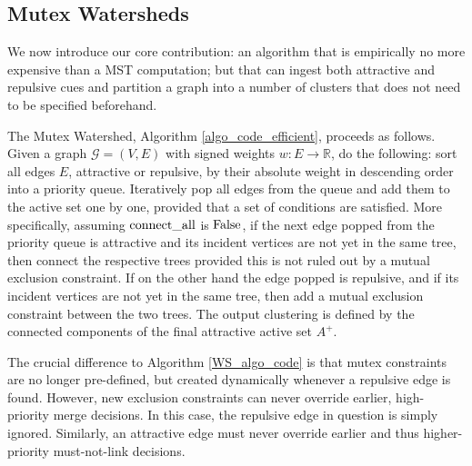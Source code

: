 \subsection{Mutex Watersheds}\label{3_3_MWS}

\noindent 
We now introduce our core contribution: an algorithm that is empirically no more expensive than a MST computation; but that can ingest both attractive and repulsive cues and partition a graph into a number of clusters that does not need to be specified beforehand. 

The Mutex Watershed, Algorithm \ref{algo_code_efficient}, proceeds as follows. Given a graph $\mathcal{G}=(V, E)$ with signed weights $w: E \rightarrow \mathbb{R}$, do the following: sort all edges $E$, attractive or repulsive, by their absolute weight in descending order into a priority queue. Iteratively pop all edges from the queue and add them to the active set one by one, provided that a set of conditions are satisfied.
More specifically, assuming $\textrm{connect\_all}$ is $\textrm{False}$, if the next edge popped from the priority queue is attractive and its incident vertices are not yet in the same tree, then connect the respective trees provided this is not ruled out by a mutual exclusion constraint. If on the other hand the edge popped is repulsive, and if its incident vertices are not yet in the same tree, then add a mutual exclusion constraint between the two trees. 
The output clustering is defined by the connected components of the final attractive active set $A^+$.

 The crucial difference to Algorithm \ref{WS_algo_code} is that mutex constraints are no longer pre-defined, but created dynamically whenever a repulsive edge is found. However, new exclusion constraints can never override earlier, high-priority merge decisions. In this case, the repulsive edge in question is simply ignored. Similarly, an attractive edge must never override earlier and thus higher-priority must-not-link decisions. 


